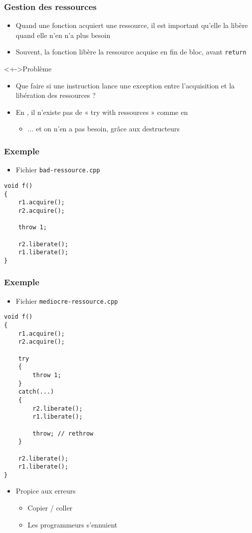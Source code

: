 \begin{frame}
\frametitle{Gestion des ressources}
\begin{itemize}[<+->]
\item Quand une fonction acquiert une ressource, il est important qu'elle la libère quand elle n'en n'a plus besoin
\item Souvent, la fonction libère la ressource acquise en fin de bloc, avant \lstinline|return|
\end{itemize}
\begin{alertblock}<+->{Problème}
	\begin{itemize}
	\item Que faire si une instruction lance une exception entre l'acquisition et la libération des ressources ?
	\end{itemize}
\end{alertblock}
\begin{itemize}[<+->]
\item En \cpp, il n'existe pas de « try with ressources » comme en \java
	\begin{itemize}
	\item ... et on n'en a pas besoin, grâce aux destructeurs
	\end{itemize}
\end{itemize}
\end{frame}

\begin{frame}[containsverbatim]
\frametitle{Exemple}
\begin{itemize}
\item Fichier \texttt{bad-ressource.cpp}
\end{itemize}
\begin{lstlisting}
void f()
{
	r1.acquire();
	r2.acquire();

	throw 1;
		
	r2.liberate();
	r1.liberate();	
}
\end{lstlisting}
\end{frame}

\begin{frame}[containsverbatim]
\frametitle{Exemple}
\begin{itemize}
\item Fichier \texttt{mediocre-ressource.cpp}
\end{itemize}
\begin{lstlisting}
void f()
{
	r1.acquire();
	r2.acquire();
	
	try
	{
		throw 1;
	}
	catch(...)
	{
		r2.liberate();
		r1.liberate();

		throw; // rethrow
	}
		
	r2.liberate();
	r1.liberate();	
}
\end{lstlisting}
\begin{itemize}
\item Propice aux erreurs
	\begin{itemize}
	\item Copier / coller
	\item Les programmeurs s'ennuient
	\end{itemize}
\end{itemize}
\end{frame}

